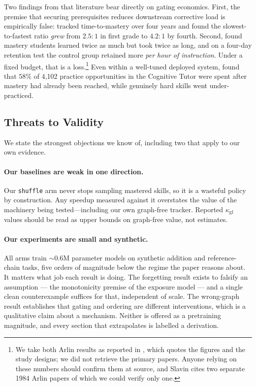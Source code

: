 \documentclass[11pt]{article}
\newcommand{\kgf}{\kappa_{\mathrm{gf}}}
\theoremstyle{plain}
\theoremstyle{definition}
\theoremstyle{remark}
\begin{document}
Two findings from that literature bear directly on gating economics. First, the
premise that securing prerequisites reduces downstream corrective load is
empirically false: \citet{arlin1984time} tracked time-to-mastery over four years
and found the slowest-to-fastest ratio \emph{grew} from $2.5{:}1$ in first grade
to $4.2{:}1$ by fourth. Second, \citet{arlin1983time} found mastery students
learned twice as much but took twice as long, and on a four-day retention test
the control group retained more \emph{per hour of instruction}. Under a fixed
budget, that is a loss.\footnote{We take both Arlin results as reported in
\citet{slavin1987mastery}, which quotes the figures and the study designs; we did
not retrieve the primary papers. Anyone relying on these numbers should confirm
them at source, and Slavin cites two separate 1984 Arlin papers of which we could
verify only one.} Even within a well-tuned deployed system,
\citet{cen2007overpractice} found that $58\%$ of 4{,}102 practice opportunities
in the Cognitive Tutor were spent after mastery had already been reached, while
genuinely hard skills went under-practiced.

\subsection{Threats to Validity}
\label{sec:threats}

We state the strongest objections we know of, including two that apply to our own
evidence.

\paragraph{Our baselines are weak in one direction.} Our \texttt{shuffle} arm
never stops sampling mastered skills, so it is a wasteful policy by construction.
Any speedup measured against it overstates the value of the machinery being
tested---including our own graph-free tracker. Reported $\kgf$ values should be
read as upper bounds on graph-free value, not estimates.

\paragraph{Our experiments are small and synthetic.} All arms train ${\sim}0.6$M
parameter models on synthetic addition and reference-chain tasks, five orders of
magnitude below the regime the paper reasons about. It matters what job each
result is doing. The forgetting result exists to falsify an assumption --- the
monotonicity premise of the exposure model --- and a single clean counterexample
suffices for that, independent of scale. The wrong-graph result establishes that
gating and ordering are different interventions, which is a qualitative claim
about a mechanism. Neither is offered as a pretraining magnitude, and every
section that extrapolates is labelled a derivation.
\end{document}
